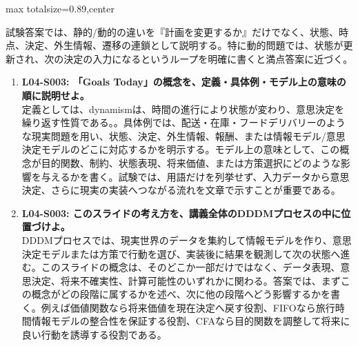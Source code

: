\begin{minipage}[t]{0.58\textwidth}
\begin{adjustbox}{max totalsize={\textwidth}{0.89\textheight},center}
\begin{minipage}{\textwidth}
試験答案では、静的/動的の違いを『計画を変更するか』だけでなく、状態、時点、決定、外生情報、遷移の連鎖として説明する。特に動的問題では、状態が更新され、次の決定の入力になるというループを明確に書くと満点答案に近づく。\par{}\begin{enumerate}\item \textbf{L04-S003: 「Goals Today」の概念を、定義・具体例・モデル上の意味の順に説明せよ。}\\定義としては、dynamismは、時間の進行により状態が変わり、意思決定を繰り返す性質である。。具体例では、配送・在庫・フードデリバリーのような現実問題を用い、状態、決定、外生情報、報酬、または情報モデル/意思決定モデルのどこに対応するかを明示する。モデル上の意味として、この概念が目的関数、制約、状態表現、将来価値、または方策選択にどのような影響を与えるかを書く。試験では、用語だけを列挙せず、入力データから意思決定、さらに現実の実装へつながる流れを文章で示すことが重要である。\item \textbf{L04-S003: このスライドの考え方を、講義全体のDDDMプロセスの中に位置づけよ。}\\DDDMプロセスでは、現実世界のデータを集約して情報モデルを作り、意思決定モデルまたは方策で行動を選び、実装後に結果を観測して次の状態へ進む。このスライドの概念は、そのどこか一部だけではなく、データ表現、意思決定、将来不確実性、計算可能性のいずれかに関わる。答案では、まずこの概念がどの段階に属するかを述べ、次に他の段階へどう影響するかを書く。例えば価値関数なら将来価値を現在決定へ戻す役割、FIFOなら旅行時間情報モデルの整合性を保証する役割、CFAなら目的関数を調整して将来に良い行動を誘導する役割である。\end{enumerate}
\end{minipage}
\end{adjustbox}
\end{minipage}


